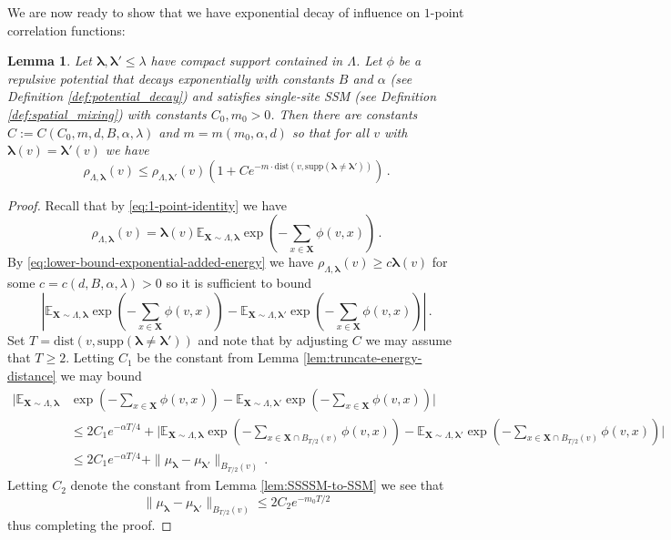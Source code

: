 \documentclass[10pt]{amsart}
\newtheorem{lemma}[theorem]{Lemma}
\theoremstyle{definition}
\theoremstyle{remark}
\newcommand{\bX}{\mathbf{X}}
\newcommand{\blambda}{{\boldsymbol{\lambda}}}
\newcommand{\dist}{\mathrm{dist}}
\newcommand{\E}{\mathbb{E}}
\begin{document}
	We are now ready to show that we have exponential decay of influence on $1$-point correlation functions:
	
	\begin{lemma}\label{lem:one-point-SSM}
		Let $\blambda,\blambda' \leq \lambda$ have compact support contained in $\Lambda$.   Let $\phi$ be a repulsive potential that decays exponentially with constants $B$ and $\alpha$ (see Definition \ref{def:potential_decay}) and satisfies single-site SSM (see Definition \ref{def:spatial_mixing}) with constants $C_0,m_0 > 0$.  Then there are constants $C := C(C_0,m,d,B,\alpha,\lambda)$ and $m = m(m_0,\alpha,d)$ so that for all $v$ with $\blambda(v) = \blambda'(v)$ we have \begin{equation*}
			\rho_{\Lambda,\blambda}(v) \leq \rho_{\Lambda,\blambda'}(v)\left( 1 + C e^{-m \cdot\dist(v,\mathrm{supp}(\blambda \neq \blambda'))}\right)\,.
		\end{equation*}
	\end{lemma}
	\begin{proof}
		Recall that by \eqref{eq:1-point-identity} we have $$\rho_{\Lambda,\blambda}(v) = \blambda(v) \E_{\bX \sim \Lambda, \blambda} \exp\left(-\sum_{x \in \bX} \phi(v,x) \right)\,.$$
		By \eqref{eq:lower-bound-exponential-added-energy} we have $\rho_{\Lambda,\blambda}(v) \geq c\blambda(v)$ for some $c = c(d,B,\alpha,\lambda) > 0$ so it is sufficient to bound \begin{equation*}
			\left|\E_{\bX \sim \Lambda, \blambda} \exp\left(-\sum_{x \in \bX} \phi(v,x) \right) - \E_{\bX \sim \Lambda, \blambda'} \exp\left(-\sum_{x \in \bX} \phi(v,x) \right) \right|\,.
		\end{equation*}
		Set $T = \dist(v,\mathrm{supp}(\blambda \neq \blambda'))$ and note that by adjusting $C$ we may assume that $T \geq 2$.  Letting $C_1$ be the constant from Lemma \ref{lem:truncate-energy-distance} we may bound \begin{align*}
			\Bigg|\E_{\bX \sim \Lambda, \blambda}& \exp\left(-\sum_{x \in \bX} \phi(v,x) \right) - \E_{\bX \sim \Lambda, \blambda'} \exp\left(-\sum_{x \in \bX} \phi(v,x) \right) \Bigg| \\
			&\leq 2 C_1 e^{-\alpha T/4} +         \Bigg|\E_{\bX \sim \Lambda, \blambda} \exp\left(-\sum_{x \in \bX \cap B_{T/2}(v)} \phi(v,x) \right) - \E_{\bX \sim \Lambda,\blambda'} \exp\left(-\sum_{x \in \bX \cap B_{T/2}(v)} \phi(v,x) \right) \Bigg| \\
			&\leq 2 C_1 e^{-\alpha T/4} + \|\mu_{\blambda} - \mu_{\blambda'}\|_{B_{T/2}(v)}\,.
		\end{align*} 
		Letting $C_2$ denote the constant from Lemma \ref{lem:SSSSM-to-SSM} we see that $$\|\mu_{\blambda} - \mu_{\blambda'}\|_{B_{T/2}(v)} \leq 2 C_2 e^{-m_0 T/2}$$
		thus completing the proof.
	\end{proof}
	
\end{document}
